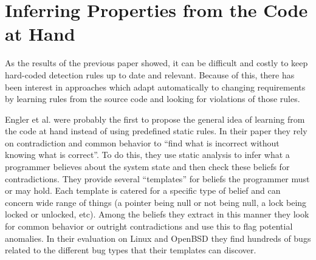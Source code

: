 \section{Inferring Properties from the Code at Hand}


As the results of the previous paper showed, it can be difficult and costly to keep hard-coded detection rules up to date and relevant.
Because of this, there has been interest in approaches which adapt automatically to changing requirements by learning rules from the source code and looking for violations of those rules.

Engler et al. \cite{engler2001bugs} were probably the first to propose the general idea of learning from the code at hand instead of using predefined static rules.
In their paper they rely on contradiction and common behavior to ``find what is incorrect without knowing what is correct''.
To do this, they use static analysis to infer what a programmer believes about the system state and then check these beliefs for contradictions.
They provide several ``templates'' for beliefs the programmer must or may hold.
Each template is catered for a specific type of belief and can concern wide range of things (a pointer being null or not being null, a lock being locked or unlocked, etc).
Among the beliefs they extract in this manner they look for common behavior or outright contradictions and use this to flag potential anomalies.
In their evaluation on Linux and OpenBSD they find hundreds of bugs related to the different bug types that their templates can discover.

